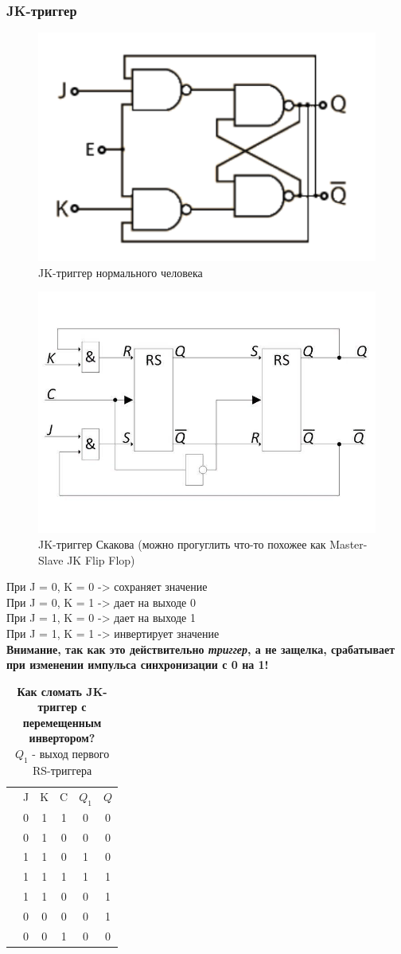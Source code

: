 \documentclass[12pt, a4paper]{article}
\begin{document}
\subsubsection{JK-триггер}
\begin{figure}[h!]
    \includegraphics[width=0.5\linewidth]{./images/3_24.png}
    \caption{JK-триггер нормального человека}
    \label{fig:my_label}
\end{figure}
\begin{figure}[h!]
    \includegraphics[width=0.4\linewidth]{./images/JK.jpg}
    \caption{JK-триггер Скакова (можно прогуглить что-то похожее как Master-Slave JK Flip Flop)}
    \label{fig:my_label}
\end{figure}
При J = 0, K = 0 -> сохраняет значение\\
При J = 0, K = 1 -> дает на выходе 0\\
При J = 1, K = 0 -> дает на выходе 1\\
При J = 1, K = 1 -> инвертирует значение\\
\textbf{Внимание, так как это действительно \textit{триггер}, а не защелка, срабатывает при изменении импульса синхронизации с 0 на 1!}\\
\begin{table}[h!]
    \centering
    \begin{tabular}{c|c|c|c|c|c|}
         & J & K & C & $Q_1$ & $Q$ \\
         & 0 & 1 & 1 & 0 & 0\\
         & 0 & 1 & 0 & 0 & 0\\
         & 1 & 1 & 0 & 1 & 0\\
         & 1 & 1 & 1 & 1 & 1\\
         & 1 & 1 & 0 & 0 & 1\\
         & 0 & 0 & 0 & 0 & 1\\
         & 0 & 0 & 1 & 0 & 0
    \end{tabular}
    \caption{\textbf{Как сломать JK-триггер с перемещенным инвертором?}\\$Q_1$ - выход первого RS-триггера}
    \label{tab:my_label}
\end{table}
\end{document}
